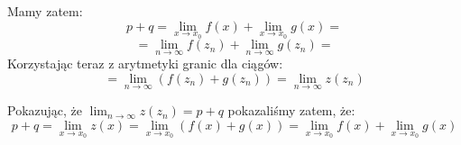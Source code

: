\documentclass{article}
\begin{document}
Mamy zatem:
\begin{equation*}
    p + q = \lim_{x \to x_0} f(x) + \lim_{x \to x_0} g(x) = 
\end{equation*}
\begin{equation*}
    = \lim_{n \to \infty} f(z_n) + \lim_{n \to \infty} g(z_n) =
\end{equation*}
Korzystając teraz z arytmetyki granic dla ciągów:
\begin{equation*}
    = \lim_{n \to \infty} (f(z_n) + g(z_n)) = \lim_{n \to \infty} z(z_n)
\end{equation*}

Pokazując, że \(\lim_{n \to \infty} z(z_n) = p + q\) pokazaliśmy zatem, że:
\begin{equation*}
    p + q = \lim_{x \to x_0} z(x) = \lim_{x \to x_0} (f(x) + g(x)) = \lim_{x \to x_0} f(x) + \lim_{x \to x_0} g(x)
\end{equation*}
\end{document}
